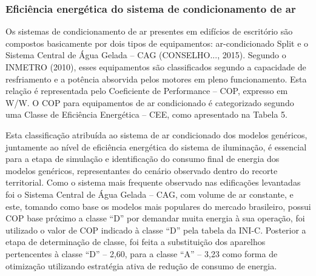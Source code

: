 \subsubsection{Eficiência energética do sistema de condicionamento de ar}
Os sistemas de condicionamento de ar presentes em edifícios de escritório são 
compostos basicamente por dois tipos de equipamentos: ar-condicionado Split e o 
Sistema Central de Água Gelada – CAG (CONSELHO..., 2015).\vspace*{0.3cm} \newline
Segundo o INMETRO (2010), esses equipamentos são classificados segundo a 
capacidade de resfriamento e a potência absorvida pelos motores em pleno 
funcionamento. Esta relação é representada pelo Coeficiente de Performance – COP, 
expresso em W/W. O COP para equipamentos de ar condicionado é categorizado 
segundo uma Classe de Eficiência Energética – CEE, como apresentado na Tabela 5.

\noindent Esta classificação atribuída ao sistema de ar condicionado dos modelos genéricos, juntamente 
ao nível de eficiência energética do sistema de iluminação, é essencial para a etapa de 
simulação e identificação do consumo final de energia dos modelos genéricos, representantes 
do cenário observado dentro do recorte territorial.\vspace*{0.3cm} \newline
Como o sistema mais frequente observado nas edificações levantadas foi o Sistema Central 
de Água Gelada – CAG, com volume de ar constante, e este, tomando como base os modelos mais 
populares do mercado brasileiro, possui COP base próximo a classe “D” por demandar muita 
energia à sua operação, foi utilizado o valor de COP indicado à classe “D” pela tabela da 
INI-C. Posterior a etapa de determinação de classe, foi feita a substituição dos aparelhos 
pertencentes à classe “D” – 2,60, para a classe “A” – 3,23 como forma de otimização 
utilizando estratégia ativa de redução de consumo de energia.
